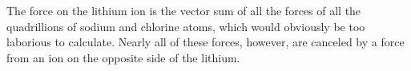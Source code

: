 The force
on the lithium ion is the vector sum of all the forces of
all the quadrillions of sodium and chlorine atoms, which
would obviously be too laborious to calculate.  Nearly all
of these forces, however, are canceled by a force from an
ion on the opposite side of the lithium.
